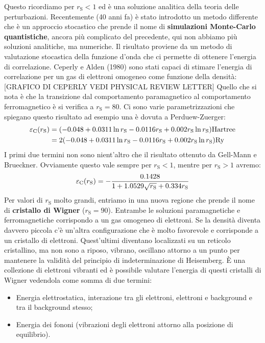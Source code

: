 Questo ricordiamo per $r_\text{S}<1$ ed è una soluzione analitica della teoria delle perturbazioni.
Recentemente (40 anni fa) è stato introdotto un metodo differente che è un approccio stocastico che prende il nome di \textbf{simulazioni Monte-Carlo quantistiche}, ancora più complicato del precedente, qui non abbiamo più soluzioni analitiche, ma numeriche. Il risultato proviene da un metodo di valutazione stocastica della funzione d'onda che ci permette di ottenere l'energia di correlazione. Ceperly e Alden (1980) sono stati capaci di stimare l'energia di correlazione per un gas di elettroni omogeneo come funzione della densità:
[GRAFICO DI CEPERLY VEDI PHYSICAL REVIEW LETTER]
Quello che si nota è che la transizione dal comportamento paramagnetico al comportamento ferromagnetico è si verifica a $r_\text{S}=80$. Ci sono varie parametrizzazioni che spiegano questo risultato ad esempio una è dovuta a Perduew-Zuerger:
\begin{equation*}
    \begin{aligned}
    \varepsilon_{\text C}(r_\text{S})& =(-0.048+0.0311 \ln r_\text{S}-0.0116r_\text{S}+0.002r_\text{S}\ln r_\text{S})\text{Hartree}\\
    & =2(-0.048+0.0311 \ln r_\text{S}-0.0116r_\text{S}+0.002r_\text{S}\ln r_\text{S})\text{Ry}
    \end{aligned}
\end{equation*}
I primi due termini non sono nient'altro che il risultato ottenuto da Gell-Mann e Brueckner. Ovviamente questo vale sempre per $r_\text{S}<1$, mentre per $r_\text{S}>1$ avremo:
\begin{equation*}
    \varepsilon_{\text C}(r_\text{S})=-\frac{0.1428}{1+1.0529\sqrt{r_\text{S}}+0.334r_\text{S}}
\end{equation*}
Per valori di $r_\text{S}$ molto grandi, entriamo in una nuova regione che prende il nome di \textbf{cristallo di Wigner} ($r_\text{S}=90$). Entrambe le soluzioni paramagnetiche e ferromagnetiche corrispondo a un gas omogeneo di elettroni. Se la densità diventa davvero piccola c'è un'altra configurazione che è molto favorevole e corrisponde a un cristallo di elettroni. Quest'ultimi diventano localizzati su un reticolo cristallino, ma non sono a riposo, vibrano, oscillano attorno a un punto per mantenere la validità del principio di indeterminazione di Heisemberg. È una collezione di elettroni vibranti ed è possibile valutare l'energia di questi cristalli di Wigner vedendola come somma di due termini: 
\begin{itemize}
    \item Energia elettrostatica, interazione tra gli elettroni, elettroni e background e tra il background stesso;
    \item Energia dei fononi (vibrazioni degli elettroni attorno alla posizione di equilibrio).
\end{itemize}
